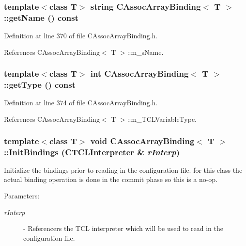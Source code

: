 \subsubsection{\setlength{\rightskip}{0pt plus 5cm}template$<$class T$>$ string CAssoc\-Array\-Binding$<$ T $>$::get\-Name () const\hspace{0.3cm}{\tt  [inline]}}\label{classCAssocArrayBinding_a10}




Definition at line 370 of file CAssoc\-Array\-Binding.h.

References CAssoc\-Array\-Binding$<$ T $>$::m\_\-s\-Name.
\subsubsection{\setlength{\rightskip}{0pt plus 5cm}template$<$class T$>$ int CAssoc\-Array\-Binding$<$ T $>$::get\-Type () const\hspace{0.3cm}{\tt  [inline]}}\label{classCAssocArrayBinding_a11}




Definition at line 374 of file CAssoc\-Array\-Binding.h.

References CAssoc\-Array\-Binding$<$ T $>$::m\_\-TCLVariable\-Type.
\subsubsection{\setlength{\rightskip}{0pt plus 5cm}template$<$class T$>$ void CAssoc\-Array\-Binding$<$ T $>$::Init\-Bindings ({\bf CTCLInterpreter} \& {\em r\-Interp})\hspace{0.3cm}{\tt  [virtual]}}\label{classCAssocArrayBinding_a12}


Initialize the bindings prior to reading in the configuration file. for this class the actual binding operation is done in the commit phase so this is a no-op. \begin{Desc}
\item[Parameters: ]\par
\begin{description}
\item[{\em 
r\-Interp}]- Referencers the TCL interpreter which will be used to read in the configuration file. \end{description}
\end{Desc}


